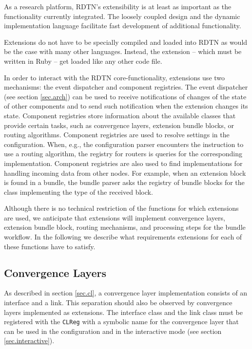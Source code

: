 \documentclass{article}
\begin{document}
As a research platform, RDTN's extensibility is at least as important as the
functionality currently integrated. The loosely coupled design and the dynamic
implementation language facilitate fast development of additional functionality.

Extensions do not have to be specially compiled and loaded into RDTN as would be
the case with many other languages. Instead, the extension -- which must be
written in Ruby -- get loaded like any other code file.

In order to interact with the RDTN core-functionality, extensions use two
mechanisms: the event dispatcher and component registries. The event dispatcher
(see section \ref{sec.arch}) can be used to receive notifications of changes of
the state of other components and to send such notification when the extension
changes its state. Component registries store information about the available
classes that provide certain tasks, such as convergence layers, extension bundle
blocks, or routing algorithms. Component registries are used to resolve settings
in the configuration. When, e.g., the configuration parser encounters the
instruction to use a routing algorithm, the registry for routers is queries for
the corresponding implementation. Component registries are also used to find
implementations for handling incoming data from other nodes. For example, when
an extension block is found in a bundle, the bundle parser asks the registry of
bundle blocks for the class implementing the type of the received block.

Although there is no technical restriction of the functions for which extensions
are used, we anticipate that extensions will implement convergence layers,
extension bundle block, routing mechanisms, and processing steps for the bundle
workflow. In the following we describe what requirements extensions for each of
these functions have to satisfy.

\subsection{Convergence Layers}\label{sec.ext.cls}

As described in section \ref{sec.cl}, a convergence layer implementation
consists of an interface and a link. This separation should also be observed by
convergence layers implemented as extensions. The interface class and the link
class must be registered with the {\tt CLReg} with a symbolic name for the
convergence layer that can be used in the configuration and in the interactive
mode (see section \ref{sec.interactive}).
\end{document}
